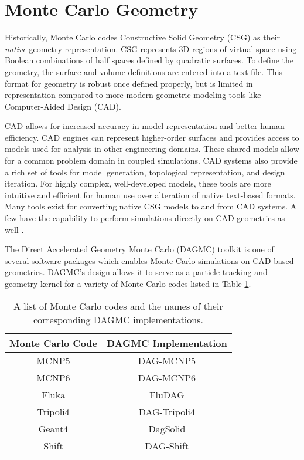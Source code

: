 \section{Monte Carlo Geometry}


Historically, Monte Carlo codes Constructive Solid Geometry (CSG) as their
\textit{native} geometry representation. CSG represents 3D regions of virtual
space using Boolean combinations of half spaces defined by quadratic
surfaces. To define the geometry, the surface and volume definitions are entered
into a text file. This format for geometry is robust once defined properly, but
is limited in representation compared to more modern geometric modeling tools
like Computer-Aided Design (CAD).

CAD allows for increased accuracy in model representation and better human
efficiency. CAD engines can represent higher-order surfaces and provides access
to models used for analysis in other engineering domains. These shared models
allow for a common problem domain in coupled simulations. CAD systems also
provide a rich set of tools for model generation, topological representation,
and design iteration. For highly complex, well-developed models, these tools are
more intuitive and efficient for human use over alteration of native text-based
formats. Many tools exist for converting native CSG models to and from CAD
systems. A few have the capability to perform simulations directly on CAD
geometries as well \cite{Leppanen_2015}.

The Direct Accelerated Geometry Monte Carlo (DAGMC) \cite{Tautges_2009} toolkit
is one of several software packages which enables Monte Carlo simulations on
CAD-based geometries. DAGMC's design allows it to serve as a particle tracking
and geometry kernel for a variety of Monte Carlo codes listed
in Table \ref{tab:dagmc_implementations}.

\begin{table}[H]
  \centering
  \begin{tabular}{c c}
    \hline
    Monte Carlo Code & DAGMC Implementation \\
    \hline
    MCNP5\cite{LANL_MCNP5_VOLIII}            & DAG-MCNP5            \\
    MCNP6\cite{Goorley_2016}                 & DAG-MCNP6            \\
    Fluka\cite{Bohlen_2014}                  & FluDAG               \\
    Tripoli4\cite{Malouch_2017}              & DAG-Tripoli4         \\
    Geant4\cite{GEANT4_2003}                 & DagSolid             \\
    Shift\cite{Pandya_2016}                  & DAG-Shift            \\
    \hline
  \end{tabular}
  \caption{A list of Monte Carlo codes and the names of their corresponding DAGMC implementations.}
  \label{tab:dagmc_implementations}
\end{table}

